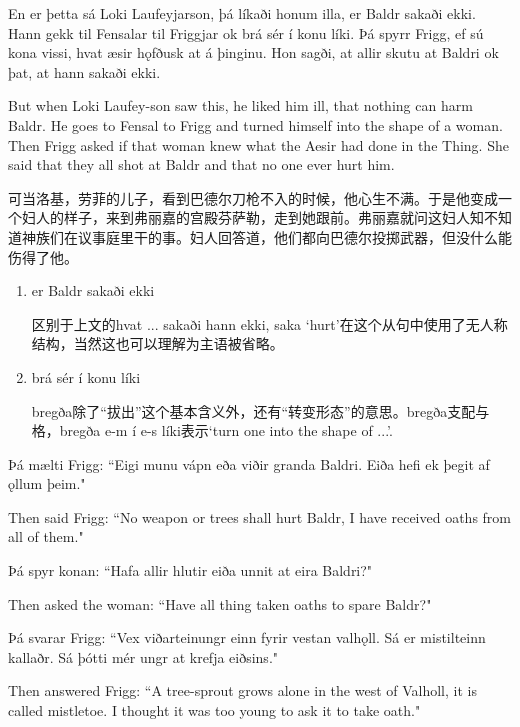 \begin{paracol}{2}
    En er þetta sá Loki Laufeyjarson, þá líkaði honum illa, er Baldr sakaði ekki. Hann gekk til Fensalar til Friggjar ok brá sér í konu líki. Þá spyrr Frigg, ef sú kona vissi, hvat æsir hǫfðusk at á þinginu. Hon sagði, at allir skutu at Baldri ok þat, at hann sakaði ekki.

    \switchcolumn

    But when Loki Laufey-son saw this, he liked him ill, that nothing can harm Baldr. He goes to Fensal to Frigg and turned himself into the shape of a woman. Then Frigg asked if that woman knew what the Aesir had done in the Thing. She said that they all shot at Baldr and that no one ever hurt him.
\end{paracol}
\begin{translation*}{}
    可当洛基，劳菲的儿子，看到巴德尔刀枪不入的时候，他心生不满。于是他变成一个妇人的样子，来到弗丽嘉的宫殿芬萨勒，走到她跟前。弗丽嘉就问这妇人知不知道神族们在议事庭里干的事。妇人回答道，他们都向巴德尔投掷武器，但没什么能伤得了他。
\end{translation*}
\begin{grammar*}{}
    \begin{enumerate}[leftmargin=*]
        \item er Baldr sakaði ekki

              区别于上文的hvat ... sakaði hann ekki, saka `hurt'在这个从句中使用了无人称结构，当然这也可以理解为主语被省略。

        \item brá sér í konu líki

              bregða除了“拔出”这个基本含义外，还有“转变形态”的意思。bregða支配与格，bregða e-m í e-s líki表示`turn one into the shape of ...'.
    \end{enumerate}
\end{grammar*}
\begin{paracol}{2}
    Þá mælti Frigg: ``Eigi munu vápn eða viðir granda Baldri. Eiða hefi ek þegit af ǫllum þeim."

    \switchcolumn

    Then said Frigg: ``No weapon or trees shall hurt Baldr, I have received oaths from all of them."

    \switchcolumn*

    Þá spyr konan: ``Hafa allir hlutir eiða unnit at eira Baldri?"

    \switchcolumn
    Then asked the woman: ``Have all thing taken oaths to spare Baldr?"

    \switchcolumn*
    Þá svarar Frigg: ``Vex viðarteinungr einn fyrir vestan valhǫll. Sá er mistilteinn kallaðr. Sá þótti mér ungr at krefja eiðsins."

    \switchcolumn

    Then answered Frigg: ``A tree-sprout grows alone in the west of Valholl, it is called mistletoe. I thought it was too young to ask it to take oath."
\end{paracol}
